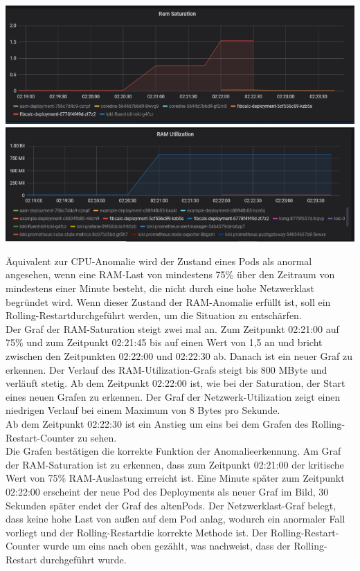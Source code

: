 \documentclass[a4paper,10pt]{scrartcl}
\begin{document}
\begin{description}
\begin{minipage}{\linewidth}
            \includegraphics[width=1\textwidth,height=.14\textheight]{img/RAMAnomalie/RAMSaturation.PNG}\\
            
  			\includegraphics[width=1\textwidth]{img/RAMAnomalie/RAMUtilization.PNG}
\end{minipage}

Äquivalent zur CPU-Anomalie wird der Zustand eines Pods als anormal angesehen, wenn eine RAM-Last von mindestens 75\% über den Zeitraum von mindestens einer Minute besteht, die nicht durch eine hohe Netzwerklast begründet wird. Wenn dieser Zustand  der RAM-Anomalie erfüllt ist, soll ein \glqq Rolling-Restart\grqq durchgeführt werden, um die Situation zu entschärfen.\\
Der Graf der RAM-Saturation steigt zwei mal an. Zum Zeitpunkt 02:21:00 auf 75\% und zum Zeitpunkt 02:21:45 bis auf einen Wert von 1,5 an und bricht zwischen den Zeitpunkten 02:22:00 und 02:22:30 ab. Danach ist ein neuer Graf zu erkennen.
Der Verlauf des RAM-Utilization-Grafs steigt bis 800 MByte und verläuft stetig. Ab dem Zeitpunkt 02:22:00 ist, wie bei der Saturation, der Start eines neuen Grafen zu erkennen.
Der Graf der Netzwerk-Utilization zeigt einen niedrigen Verlauf bei einem Maximum von 8 Bytes pro Sekunde.\\
Ab dem Zeitpunkt 02:22:30 ist ein Anstieg um eins bei dem Grafen des \glqq Rolling-Restart\grqq -Counter zu sehen.\\
Die Grafen bestätigen die korrekte Funktion der Anomalieerkennung. Am Graf der RAM-Saturation ist zu erkennen, dass zum Zeitpunkt 02:21:00 der kritische Wert von 75\% RAM-Auslastung erreicht ist. Eine Minute später zum Zeitpunkt 02:22:00 erscheint der neue Pod des Deployments als neuer Graf im Bild, 30 Sekunden später endet der Graf des \glqq alten\grqq Pods. Der Netzwerklast-Graf belegt, dass keine hohe Last von außen auf dem Pod anlag, wodurch ein anormaler Fall vorliegt und der \glqq Rolling-Restart\grqq die korrekte Methode ist.
Der \glqq Rolling-Restart\grqq -Counter wurde um eins nach oben gezählt, was nachweist, dass der Rolling-Restart durchgeführt wurde. 
\pagebreak


\end{description}
\end{document}
